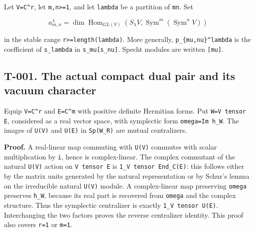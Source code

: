 \documentclass[
  10pt,
]{article}
\begin{document}
Let \texttt{\small V=\allowbreak{}C\textasciicircum{}r}, let
\texttt{\small m,\allowbreak{}n>=\allowbreak{}1}, and let
\texttt{\small lambda} be a partition of \texttt{\small mn}. Set

\[
a_{m,n}^{\lambda}=\dim\operatorname{Hom}_{GL(V)}
(S_\lambda V,\operatorname{Sym}^m(\operatorname{Sym}^n V))
\]

in the stable range
\texttt{\small r>=\allowbreak{}length(\allowbreak{}lambda)\allowbreak{}}.
More generally,
\texttt{\small p\_\allowbreak{}\{mu,\allowbreak{}nu\}\textasciicircum{}lambda}
is the coefficient of \texttt{\small s\_\allowbreak{}lambda} in
\texttt{\small s\_\allowbreak{}mu[\allowbreak{}s\_\allowbreak{}nu]\allowbreak{}}.
Specht modules are written
\texttt{\small [\allowbreak{}mu]\allowbreak{}}.

\subsection{T-001. The actual compact dual pair and its vacuum
character}\label{t-001.-the-actual-compact-dual-pair-and-its-vacuum-character}

Equip \texttt{\small V=\allowbreak{}C\textasciicircum{}r} and
\texttt{\small E=\allowbreak{}C\textasciicircum{}m} with positive
definite Hermitian forms. Put \texttt{\small W=\allowbreak{}V tensor E},
considered as a real vector space, with symplectic form
\texttt{\small omega=\allowbreak{}Im h\_\allowbreak{}W}. The images of
\texttt{\small U(\allowbreak{}V)\allowbreak{}} and
\texttt{\small U(\allowbreak{}E)\allowbreak{}} in
\texttt{\small Sp(\allowbreak{}W\_\allowbreak{}R)\allowbreak{}} are
mutual centralizers.

\textbf{Proof.} A real-linear map commuting with
\texttt{\small U(\allowbreak{}V)\allowbreak{}} commutes with scalar
multiplication by \texttt{\small i}, hence is complex-linear. The
complex commutant of the natural
\texttt{\small U(\allowbreak{}V)\allowbreak{}} action on
\texttt{\small V tensor E} is
\texttt{\small 1\_\allowbreak{}V tensor End\_\allowbreak{}C(\allowbreak{}E)\allowbreak{}}:
this follows either by the matrix units generated by the natural
representation or by Schur's lemma on the irreducible natural
\texttt{\small U(\allowbreak{}V)\allowbreak{}} module. A complex-linear
map preserving \texttt{\small omega} preserves
\texttt{\small h\_\allowbreak{}W}, because its real part is recovered
from \texttt{\small omega} and the complex structure. Thus the
symplectic centralizer is exactly
\texttt{\small 1\_\allowbreak{}V tensor U(\allowbreak{}E)\allowbreak{}}.
Interchanging the two factors proves the reverse centralizer identity.
This proof also covers \texttt{\small r=\allowbreak{}1} or
\texttt{\small m=\allowbreak{}1}.
\end{document}
